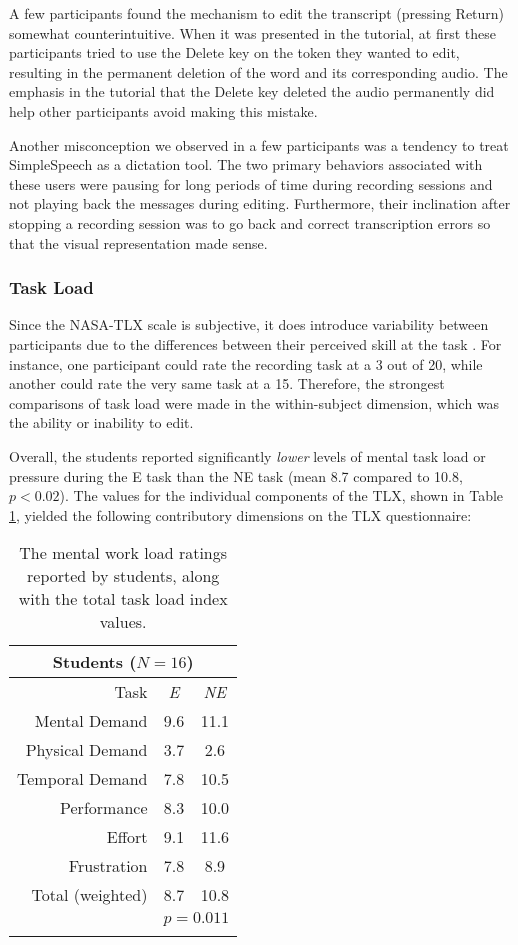A few participants found the mechanism to edit the transcript (pressing Return) somewhat counterintuitive. 
When it was presented in the tutorial, at first these participants tried to use the Delete key on the token they wanted to edit, resulting in the permanent deletion of the word and its corresponding audio. 
The emphasis in the tutorial that the Delete key deleted the audio permanently did help other participants avoid making this mistake.

Another misconception we observed in a few participants was a tendency to treat SimpleSpeech as a dictation tool. 
The two primary behaviors associated with these users were pausing for long periods of time during recording sessions and not playing back the messages during editing. 
Furthermore, their inclination after stopping a recording session was to go back and correct transcription errors so that the visual representation made sense.

\subsubsection{Task Load}
Since the NASA-TLX scale is subjective, it does introduce variability between participants due to the differences between their perceived skill at the task \cite{nasatlx}. 
For instance, one participant could rate the recording task at a 3 out of 20, while another could rate the very same task at a 15.
Therefore, the strongest comparisons of task load were made in the within-subject dimension, which was the ability or inability to edit.

Overall, the students reported significantly \emph{lower} levels of mental task load or pressure during the E task than the NE task (mean 8.7 compared to 10.8, $p<0.02$). 
The values for the individual components of the TLX, shown in Table \ref{tab:table1}, yielded the following contributory dimensions on the TLX questionnaire:

\begin{table}
	\centering
	\begin{tabular}{r c c}
		\multicolumn{3}{c}{\textbf{Students} ($N=16$)} \\
		\toprule
		Task			& \textit{E} & \textit{NE} \\
		Mental Demand   & 9.6      & 11.1      \\
		Physical Demand & 3.7      & 2.6       \\
		Temporal Demand & 7.8      & 10.5      \\
		Performance     & 8.3      & 10.0      \\
		Effort          & 9.1      & 11.6      \\
		Frustration     & 7.8      & 8.9       \\
		\midrule
		Total (weighted)& 8.7 & 10.8 \\
		& \multicolumn{2}{c}{$p=0.011$} \\
		\bottomrule \\
	\end{tabular}
	\caption{The mental work load ratings reported by students, along with the total task load index values.}~\label{tab:table1}
\end{table}

